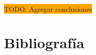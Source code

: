 \documentclass[spanish, 12pt]{article}
\newcommand{\TODO}[1]{
    \begin{center}
        \colorbox{orange}{{\Huge TODO: }#1}
    \end{center}
}
\begin{document}
    
    \tableofcontents

    \newpage
    
    

    \newpage
    

    \newpage
    

    \newpage
    

    \TODO{Agregar conclusiones}
    
    \newpage
    \section{Bibliografía}
    \printbibliography[heading=none]
\end{document}

